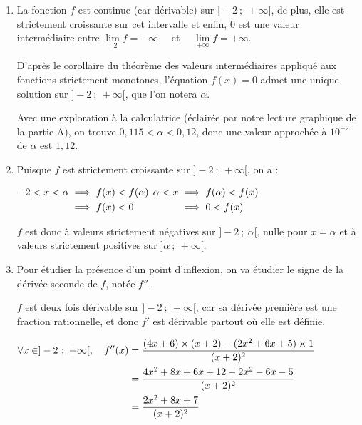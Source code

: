 \begin{enumerate}
$f'$ est donc une fonction à valeurs strictement positives sur $]-2~;~+\infty[$, et $f$ est donc strictement croissante sur $]-2~;~+\infty[$.

On peut donc établir le tableau de variations suivant :

	\hfill~\hfill~

\item La fonction $f$ est continue (car dérivable) sur $]-2~;~+\infty[$, de plus, elle est strictement croissante sur cet intervalle et enfin, 0 est une valeur intermédiaire entre $\lim\limits_{-2}f = -\infty$ ~~et~~ $\lim\limits_{+\infty}f = + \infty$.

D'après le corollaire du théorème des valeurs intermédiaires appliqué aux fonctions strictement monotones, l'équation $f(x) = 0$ admet une unique solution sur $]- 2~;~+\infty[$, que l'on notera $\alpha$.

Avec une exploration à la calculatrice (éclairée par notre lecture graphique de la partie A), on trouve $0,115 < \alpha < 0,12$, donc une valeur approchée à $10^{-2}$ de $\alpha$ est $1,12$.

\item Puisque $f$ est strictement croissante sur $]-2~;~+\infty[$, on a :

$\aligned -2 < x <\alpha &\implies f(x) < f(\alpha)\\
&\implies f(x) < 0\endaligned$ \hfill
$\aligned \alpha <x  &\implies  f(\alpha) < f(x)\\
&\implies 0< f(x) \endaligned$\hfill~

$f$ est donc à valeurs strictement négatives sur $]-2~;~\alpha[$, nulle pour $x = \alpha$ et à valeurs strictement positives sur $]\alpha~;~+\infty[$.

\item Pour étudier la présence d'un point d'inflexion, on va étudier le signe de la dérivée seconde de $f$, notée $f''$.

$f$ est deux fois dérivable sur $]-2~;~+\infty[$, car sa dérivée première est une fraction rationnelle, et donc $f'$ est dérivable partout où elle est définie.

$\aligned \forall x \in ]-2~;~+\infty[,\quad f''(x) &= \dfrac{(4x + 6)\times (x+2) - (2x^2 + 6x + 5)\times 1}{(x+2)^2}\\
&=\dfrac{4x^2+8x+6x+12-2x^2-6x-5}{(x+2)^2}\\
&=\dfrac{2x^2 +8x +7}{(x+2)^2}
\endaligned$


\end{enumerate}
